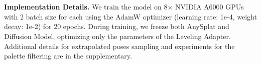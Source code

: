 \\
\\
\noindent\textbf{Implementation Details.} We train the model on 8× NVIDIA A6000 GPUs with 2 batch size for each using the AdamW optimizer (learning rate: 1e-4, weight decay: 1e-2) for 20 epochs. During training, we freeze both AnySplat and Diffusion Model, optimizing only the parameters of the Leveling Adapter. Additional details for extrapolated poses sampling and experiments for the palette filtering are in the supplementary.





